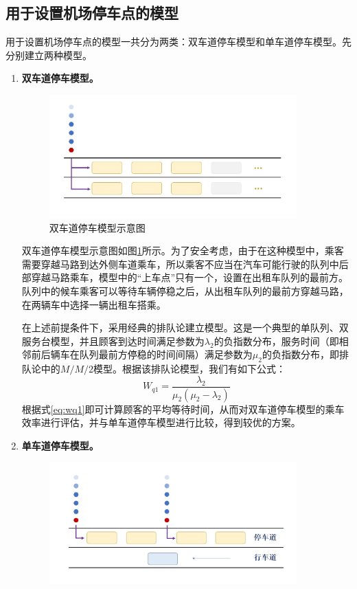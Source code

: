 \documentclass{cumcm}
\begin{document}
\subsection{用于设置机场停车点的模型}
用于设置机场停车点的模型一共分为两类：双车道停车模型和单车道停车模型。先分别建立两种模型。
\begin{enumerate}[(1)]
	\item \textbf{双车道停车模型。}\par
	\begin{figure}[H]
		\centering
		\includegraphics[width=0.9\textwidth]{img/problem3_double.jpg}
		\caption{双车道停车模型示意图}
		\label{fi:problem3double}
	\end{figure}
	双车道停车模型示意图如图\ref{fi:problem3double}所示。为了安全考虑，由于在这种模型中，乘客需要穿越马路到达外侧车道乘车，所以乘客不应当在汽车可能行驶的队列中后部穿越马路乘车，模型中的“上车点”只有一个，设置在出租车队列的最前方。队列中的候车乘客可以等待车辆停稳之后，从出租车队列的最前方穿越马路，在两辆车中选择一辆出租车搭乘。\par
	在上述前提条件下，采用经典的排队论建立模型。这是一个典型的单队列、双服务台模型，并且顾客到达时间满足参数为$\lambda_2$的负指数分布，服务时间（即相邻前后辆车在队列最前方停稳的时间间隔）满足参数为$\mu_2$的负指数分布，即排队论中的$M/M/2$模型。根据该排队论模型，我们有如下公式\cite{queuebook}：
	\begin{equation}
		W_{q1}=\frac{\lambda_2}{\mu_2(\mu_2-\lambda_2)}
		\label{eq:wq1}
	\end{equation}
	根据式\ref{eq:wq1}即可计算顾客的平均等待时间，从而对双车道停车模型的乘车效率进行评估，并与单车道停车模型进行比较，得到较优的方案。
	\item \textbf{单车道停车模型。}\par
	\begin{figure}[H]
		\centering
		\includegraphics[width=0.9\textwidth]{img/problem3_single.jpg}

\end{figure}
\end{enumerate}
\end{document}
